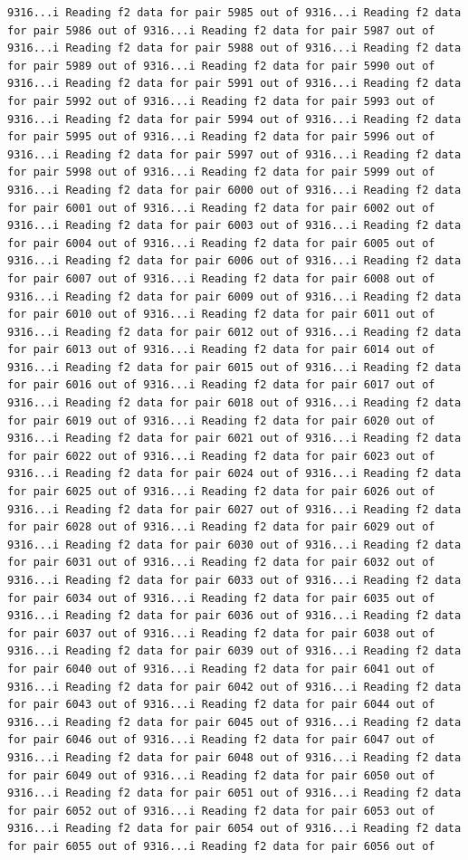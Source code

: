 \documentclass[
]{article}
\begin{document}
\begin{verbatim}
9316...i Reading f2 data for pair 5985 out of 9316...i Reading f2 data for pair 5986 out of 9316...i Reading f2 data for pair 5987 out of 9316...i Reading f2 data for pair 5988 out of 9316...i Reading f2 data for pair 5989 out of 9316...i Reading f2 data for pair 5990 out of 9316...i Reading f2 data for pair 5991 out of 9316...i Reading f2 data for pair 5992 out of 9316...i Reading f2 data for pair 5993 out of 9316...i Reading f2 data for pair 5994 out of 9316...i Reading f2 data for pair 5995 out of 9316...i Reading f2 data for pair 5996 out of 9316...i Reading f2 data for pair 5997 out of 9316...i Reading f2 data for pair 5998 out of 9316...i Reading f2 data for pair 5999 out of 9316...i Reading f2 data for pair 6000 out of 9316...i Reading f2 data for pair 6001 out of 9316...i Reading f2 data for pair 6002 out of 9316...i Reading f2 data for pair 6003 out of 9316...i Reading f2 data for pair 6004 out of 9316...i Reading f2 data for pair 6005 out of 9316...i Reading f2 data for pair 6006 out of 9316...i Reading f2 data for pair 6007 out of 9316...i Reading f2 data for pair 6008 out of 9316...i Reading f2 data for pair 6009 out of 9316...i Reading f2 data for pair 6010 out of 9316...i Reading f2 data for pair 6011 out of 9316...i Reading f2 data for pair 6012 out of 9316...i Reading f2 data for pair 6013 out of 9316...i Reading f2 data for pair 6014 out of 9316...i Reading f2 data for pair 6015 out of 9316...i Reading f2 data for pair 6016 out of 9316...i Reading f2 data for pair 6017 out of 9316...i Reading f2 data for pair 6018 out of 9316...i Reading f2 data for pair 6019 out of 9316...i Reading f2 data for pair 6020 out of 9316...i Reading f2 data for pair 6021 out of 9316...i Reading f2 data for pair 6022 out of 9316...i Reading f2 data for pair 6023 out of 9316...i Reading f2 data for pair 6024 out of 9316...i Reading f2 data for pair 6025 out of 9316...i Reading f2 data for pair 6026 out of 9316...i Reading f2 data for pair 6027 out of 9316...i Reading f2 data for pair 6028 out of 9316...i Reading f2 data for pair 6029 out of 9316...i Reading f2 data for pair 6030 out of 9316...i Reading f2 data for pair 6031 out of 9316...i Reading f2 data for pair 6032 out of 9316...i Reading f2 data for pair 6033 out of 9316...i Reading f2 data for pair 6034 out of 9316...i Reading f2 data for pair 6035 out of 9316...i Reading f2 data for pair 6036 out of 9316...i Reading f2 data for pair 6037 out of 9316...i Reading f2 data for pair 6038 out of 9316...i Reading f2 data for pair 6039 out of 9316...i Reading f2 data for pair 6040 out of 9316...i Reading f2 data for pair 6041 out of 9316...i Reading f2 data for pair 6042 out of 9316...i Reading f2 data for pair 6043 out of 9316...i Reading f2 data for pair 6044 out of 9316...i Reading f2 data for pair 6045 out of 9316...i Reading f2 data for pair 6046 out of 9316...i Reading f2 data for pair 6047 out of 9316...i Reading f2 data for pair 6048 out of 9316...i Reading f2 data for pair 6049 out of 9316...i Reading f2 data for pair 6050 out of 9316...i Reading f2 data for pair 6051 out of 9316...i Reading f2 data for pair 6052 out of 9316...i Reading f2 data for pair 6053 out of 9316...i Reading f2 data for pair 6054 out of 9316...i Reading f2 data for pair 6055 out of 9316...i Reading f2 data for pair 6056 out of 
\end{verbatim}
\end{document}
